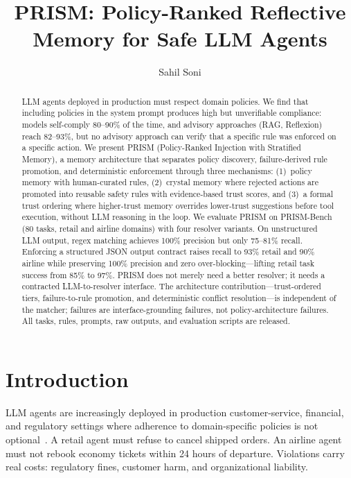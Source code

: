 \documentclass[11pt]{article}
\title{PRISM: Policy-Ranked Reflective Memory for Safe LLM Agents}
\author{Sahil Soni}
\date{}
\begin{document}
\maketitle

\begin{abstract}
LLM agents deployed in production must respect domain policies.
We find that including policies in the system prompt produces high but
unverifiable compliance: models self-comply 80--90\% of the time, and
advisory approaches (RAG, Reflexion) reach 82--93\%, but no advisory
approach can verify that a specific rule was enforced on a specific action.
We present PRISM (Policy-Ranked Injection with Stratified Memory),
a memory architecture that separates policy discovery, failure-derived
rule promotion, and deterministic enforcement through three mechanisms:
(1)~policy memory with human-curated rules,
(2)~crystal memory where rejected actions are promoted into reusable
safety rules with evidence-based trust scores,
and (3)~a formal trust ordering where higher-trust memory overrides
lower-trust suggestions before tool execution, without LLM reasoning
in the loop.
We evaluate PRISM on PRISM-Bench (80 tasks, retail and airline domains)
with four resolver variants.
On unstructured LLM output, regex matching achieves 100\% precision
but only 75--81\% recall.
Enforcing a structured JSON output contract raises recall to 93\%
retail and 90\% airline while preserving 100\% precision and zero
over-blocking---lifting retail task success from 85\% to 97\%.
PRISM does not merely need a better resolver; it needs a contracted
LLM-to-resolver interface.
The architecture contribution---trust-ordered tiers, failure-to-rule
promotion, and deterministic conflict resolution---is independent
of the matcher; failures are interface-grounding failures,
not policy-architecture failures.
All tasks, rules, prompts, raw outputs, and evaluation scripts are released.
\end{abstract}

\section{Introduction}
\label{sec:intro}

LLM agents are increasingly deployed in production customer-service, financial, and regulatory settings
where adherence to domain-specific policies is not optional~\cite{yao2023react,shinn2023reflexion}.
A retail agent must refuse to cancel shipped orders.
An airline agent must not rebook economy tickets within 24 hours of departure.
Violations carry real costs: regulatory fines, customer harm, and organizational liability.
\end{document}
